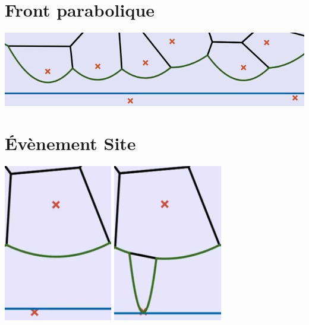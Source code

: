 \documentclass[a4paper, 10pt]{article}
\begin{document}
\begin{center}
\section*{Front parabolique}
\includegraphics[scale=0.8]{FrontParabolique.PNG}
\bigbreak 
\section*{Évènement Site}  
\includegraphics[scale=1]{AvantIntersection.PNG}
\includegraphics[scale=1]{ApresIntersection.PNG} 
\bigbreak

\end{center}
\end{document}
